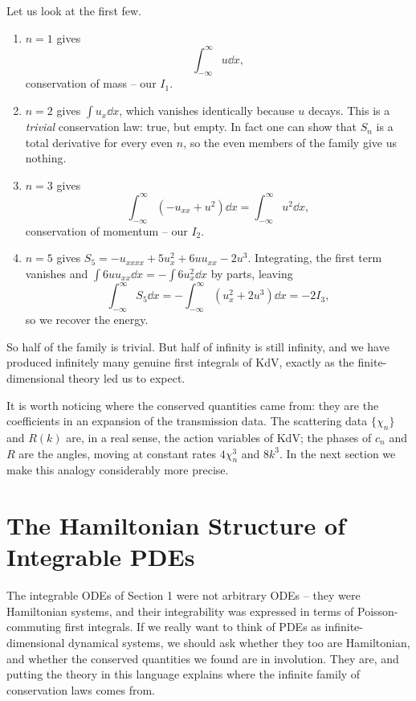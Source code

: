 Let us look at the first few.
\begin{enumerate}[label=(\roman*)]
	\item $n=1$ gives
	$$
	\int_{-\infty}^\infty u\dd x,
	$$
	conservation of mass -- our $I_1$.
	\item $n=2$ gives $\int u_x\dd x$, which vanishes identically because $u$ decays. This is a \emph{trivial} conservation law: true, but empty. In fact one can show that $S_n$ is a total derivative for every even $n$, so the even members of the family give us nothing.
	\item $n=3$ gives
	$$
	\int_{-\infty}^\infty\left(-u_{xx} + u^2\right)\dd x = \int_{-\infty}^\infty u^2\dd x,
	$$
	conservation of momentum -- our $I_2$.
	\item $n=5$ gives $S_5 = -u_{xxxx} + 5u_x^2 + 6uu_{xx} - 2u^3$. Integrating, the first term vanishes and $\int 6uu_{xx}\dd x = -\int6u_x^2\dd x$ by parts, leaving
	$$
	\int_{-\infty}^\infty S_5\dd x = -\int_{-\infty}^\infty\left(u_x^2 + 2u^3\right)\dd x = -2I_3,
	$$
	so we recover the energy.
\end{enumerate}
So half of the family is trivial. But half of infinity is still infinity, and we have produced infinitely many genuine first integrals of KdV, exactly as the finite-dimensional theory led us to expect.

\begin{remark}
	It is worth noticing where the conserved quantities came from: they are the coefficients in an expansion of the transmission data. The scattering data $\{\chi_n\}$ and $R(k)$ are, in a real sense, the action variables of KdV; the phases of $c_n$ and $R$ are the angles, moving at constant rates $4\chi_n^3$ and $8k^3$. In the next section we make this analogy considerably more precise.
\end{remark}

\section{The Hamiltonian Structure of Integrable PDEs}

The integrable ODEs of Section 1 were not arbitrary ODEs -- they were Hamiltonian systems, and their integrability was expressed in terms of Poisson-commuting first integrals. If we really want to think of PDEs as infinite-dimensional dynamical systems, we should ask whether they too are Hamiltonian, and whether the conserved quantities we found are in involution. They are, and putting the theory in this language explains where the infinite family of conservation laws comes from.

